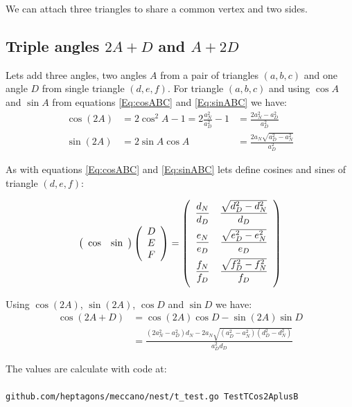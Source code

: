 \documentclass[11pt]{article}
\begin{document}
We can attach three triangles to share a common vertex and two sides.

\subsection{Triple angles $2A+D$ and $A+2D$}

Lets add three angles, two angles $A$ from a pair of triangles $(a,b,c)$ and one angle $D$ from single triangle $(d,e,f)$.
For triangle $(a,b,c)$ and using $\cos{A}$ and $\sin{A}$ from equations \ref{Eq:cosABC} and \ref{Eq:sinABC} we have:
\begin{align}
\cos{(2A)} &= 2\cos^2{A} - 1 = 2\frac{a_N^2}{a_D^2} - 1 &= \frac{2a_N^2 - a_D^2}{a_D^2}\\
\sin{(2A)} &= 2\sin{A}\cos{A} &= \frac{2a_N\sqrt{a_D^2 - a_N^2}}{a_D^2}
\end{align}

As with equations \ref{Eq:cosABC} and \ref{Eq:sinABC} lets define cosines and sines of triangle $(d,e,f)$:

\begin{equation}\label{Eq:cossinDEF}
\left({\begin{array}{c c} {\cos} & {\sin}\end{array}}\right)
\left({\begin{array}{c} D\\ E\\ F\\ \end{array}}\right)
= \left({\begin{array}{c c}
\dfrac{d_N}{d_D} & \dfrac{\sqrt{d_D^2 - d_N^2}}{d_D}\\[10pt]
\dfrac{e_N}{e_D} & \dfrac{\sqrt{e_D^2 - e_N^2}}{e_D}\\[10pt]
\dfrac{f_N}{f_D} & \dfrac{\sqrt{f_D^2 - f_N^2}}{f_D}\\[10pt]
\end{array}}\right)
\end{equation}

Using $\cos{(2A)}$, $\sin{(2A)}$, $\cos{D}$ and $\sin{D}$ we have:
\begin{align}
\cos{(2A+D)} &= \cos{(2A)}\cos{D} - \sin{(2A)}\sin{D}\\
 &= \frac{(2a_N^2 - a_D^2)d_N - 2a_N\sqrt{(a_D^2 - a_N^2)(d_D^2 - d_N^2)}}{a_D^2d_D}
\end{align}

The values are calculate with code at:
\\\\
\texttt{github.com/heptagons/meccano/nest/t\_test.go TestTCos2AplusB}
\end{document}
